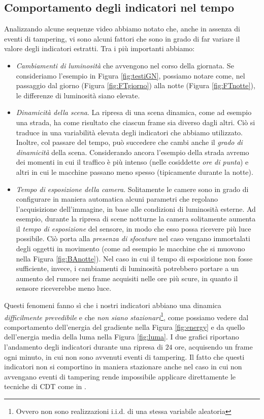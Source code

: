 \subsection{Comportamento degli indicatori nel tempo}
\label{comportamento}
Analizzando alcune sequenze video abbiamo notato che, anche in assenza di eventi di tampering, vi sono alcuni fattori che sono in grado di far variare il valore degli indicatori estratti.
Tra i pi\`u importanti abbiamo:
\begin{itemize}
	\item \textit{Cambiamenti di luminosit\`a} che avvengono nel corso della giornata. 
	Se consideriamo l'esempio in Figura \ref{fig:testiGN}, possiamo notare come, nel passaggio dal giorno (Figura \ref{fig:FTgiorno}) alla notte (Figura \ref{fig:FTnotte}), le differenze di luminosit\`a siano elevate.  
	\item \textit{Dinamicit\`a della scena}. La ripresa di una scena dinamica, come ad esempio una strada, ha come risultato che ciascun frame sia diverso dagli altri.
	Ci\`o si traduce in una variabilit\`a elevata degli indicatori che abbiamo utilizzato. 
	Inoltre, col passare del tempo, pu\`o succedere che cambi anche il \textit{grado di dinamicit\`a} della scena.
	Considerando ancora l'esempio della strada avremo dei momenti in cui il traffico \`e pi\`u intenso (nelle cosiddette \textit{ore di punta}) e altri in cui le macchine passano meno spesso (tipicamente durante la notte).
	\item \textit{Tempo di esposizione della camera}. Solitamente le camere sono in grado di configurare in maniera automatica alcuni parametri che regolano l'acquisizione dell'immagine, in base alle condizioni di luminosit\`a esterne.
	Ad esempio, durante la ripresa di scene notturne la camera solitamente aumenta il \textit{tempo di esposizione} del sensore, in modo che esso possa ricevere pi\`u luce possibile.
	Ci\`o porta alla \textit{presenza di sfocature} nel caso vengano immortalati degli oggetti in movimento (come ad esempio le macchine che si muovono nella Figura \ref{fig:BAnotte}).
	Nel caso in cui il tempo di esposizione non fosse sufficiente, invece, i cambiamenti di luminosit\`a potrebbero portare a un aumento del rumore nei frame acquisiti nelle ore pi\`u scure, in quanto il sensore riceverebbe meno luce.
\end{itemize} 
Questi fenomeni fanno s\`i che i nostri indicatori abbiano una dinamica \textit{difficilmente prevedibile} e che \textit{non siano stazionari}\footnote{Ovvero non sono realizzazioni i.i.d. di una stessa variabile aleatoria}, come possiamo vedere dal comportamento dell'energia del gradiente nella Figura \ref{fig:energy} e da quello dell'energia media della luma nella Figura \ref{fig:luma}.
I due grafici riportano l'andamento degli indicatori durante una ripresa di $24$ ore, acquisendo un frame ogni minuto, in cui non sono avvenuti eventi di tampering.
Il fatto che questi indicatori non si comportino in maniera stazionare anche nel caso in cui non avvengano eventi di tampering rende impossibile applicare direttamente le tecniche di CDT come in \cite{alippi2010detecting}. \\
